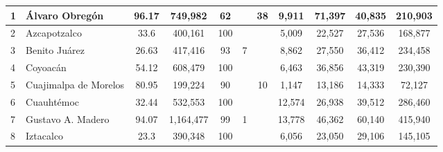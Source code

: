 \begin{landscape}
\begin{table}[]
{\begin{tabular}{llcccllcccc}
\multicolumn{1}{|l|}{1} & \multicolumn{1}{l|}{Álvaro Obregón} & \multicolumn{1}{c|}{96.17} & \multicolumn{1}{c|}{749,982} & \multicolumn{1}{c|}{62} & \multicolumn{1}{c|}{} & \multicolumn{1}{c|}{38} & \multicolumn{1}{c|}{9,911} & \multicolumn{1}{c|}{71,397} & \multicolumn{1}{c|}{40,835} & \multicolumn{1}{c|}{210,903} \\ \hline
\multicolumn{1}{|l|}{2} & \multicolumn{1}{l|}{Azcapotzalco} & \multicolumn{1}{c|}{33.6} & \multicolumn{1}{c|}{400,161} & \multicolumn{1}{c|}{100} & \multicolumn{1}{l|}{} & \multicolumn{1}{c|}{} & \multicolumn{1}{c|}{5,009} & \multicolumn{1}{c|}{22,527} & \multicolumn{1}{c|}{27,536} & \multicolumn{1}{c|}{168,877} \\ \hline
\multicolumn{1}{|l|}{3} & \multicolumn{1}{l|}{Benito Juárez} & \multicolumn{1}{c|}{26.63} & \multicolumn{1}{c|}{417,416} & \multicolumn{1}{c|}{93} & \multicolumn{1}{c|}{7} & \multicolumn{1}{l|}{} & \multicolumn{1}{c|}{8,862} & \multicolumn{1}{c|}{27,550} & \multicolumn{1}{c|}{36,412} & \multicolumn{1}{c|}{234,458} \\ \hline
\multicolumn{1}{|l|}{4} & \multicolumn{1}{l|}{Coyoacán} & \multicolumn{1}{c|}{54.12} & \multicolumn{1}{c|}{608,479} & \multicolumn{1}{c|}{100} & \multicolumn{1}{l|}{} & \multicolumn{1}{l|}{} & \multicolumn{1}{c|}{6,463} & \multicolumn{1}{c|}{36,856} & \multicolumn{1}{c|}{43,319} & \multicolumn{1}{c|}{230,390} \\ \hline
\multicolumn{1}{|l|}{5} & \multicolumn{1}{l|}{Cuajimalpa de Morelos} & \multicolumn{1}{c|}{80.95} & \multicolumn{1}{c|}{199,224} & \multicolumn{1}{c|}{90} & \multicolumn{1}{l|}{} & \multicolumn{1}{c|}{10} & \multicolumn{1}{c|}{1,147} & \multicolumn{1}{c|}{13,186} & \multicolumn{1}{c|}{14,333} & \multicolumn{1}{c|}{72,127} \\ \hline
\multicolumn{1}{|l|}{6} & \multicolumn{1}{l|}{Cuauhtémoc} & \multicolumn{1}{c|}{32.44} & \multicolumn{1}{c|}{532,553} & \multicolumn{1}{c|}{100} & \multicolumn{1}{l|}{} & \multicolumn{1}{l|}{} & \multicolumn{1}{c|}{12,574} & \multicolumn{1}{c|}{26,938} & \multicolumn{1}{c|}{39,512} & \multicolumn{1}{c|}{286,460} \\ \hline
\multicolumn{1}{|l|}{7} & \multicolumn{1}{l|}{Gustavo A. Madero} & \multicolumn{1}{c|}{94.07} & \multicolumn{1}{c|}{1,164,477} & \multicolumn{1}{c|}{99} & \multicolumn{1}{c|}{1} & \multicolumn{1}{l|}{} & \multicolumn{1}{c|}{13,778} & \multicolumn{1}{c|}{46,362} & \multicolumn{1}{c|}{60,140} & \multicolumn{1}{c|}{415,940} \\ \hline
\multicolumn{1}{|l|}{8} & \multicolumn{1}{l|}{Iztacalco} & \multicolumn{1}{c|}{23.3} & \multicolumn{1}{c|}{390,348} & \multicolumn{1}{c|}{100} & \multicolumn{1}{l|}{} & \multicolumn{1}{l|}{} & \multicolumn{1}{c|}{6,056} & \multicolumn{1}{c|}{23,050} & \multicolumn{1}{c|}{29,106} & \multicolumn{1}{c|}{145,105} \\ \hline

\end{tabular}}
\end{table}
\end{landscape}
